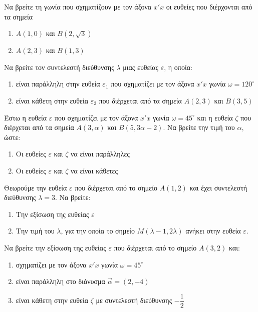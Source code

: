 \documentclass{../../presentation}
\begin{document}
\begin{askisi}
  Να βρείτε τη γωνία που σχηματίζουν με τον άξονα $x'x$ οι ευθείες που διέρχονται από τα σημεία
  \begin{enumerate}[<+->]
    \item $Α(1,0)$ και $Β(2,\sqrt{3})$
    \item $Α(2,3)$ και $Β(1,3)$
  \end{enumerate}
\end{askisi}

\begin{askisi}
  Να βρείτε τον συντελεστή διεύθυνσης $λ$ μιας ευθείας $ε$, η οποία:
  \begin{enumerate}[<+->]
    \item είναι παράλληλη στην ευθεία $ε_1$ που σχηματίζει με τον άξονα $x'x$ γωνία $ω=120^{\circ}$
    \item είναι κάθετη στην ευθεία $ε_2$ που διέρχεται από τα σημεία $Α(2,3)$ και $Β(3,5)$
  \end{enumerate}
\end{askisi}

\begin{askisi}
  Έστω η ευθεία $ε$ που σχηματίζει με τον άξονα $x'x$ γωνία $ω=45^{\circ}$ και η ευθεία $ζ$ που διέρχεται από τα σημεία $Α(3,α)$ και $Β(5,3α-2)$. Να βρείτε την τιμή του $α$, ώστε:
  \begin{enumerate}[<+->]
    \item Οι ευθείες $ε$ και $ζ$ να είναι παράλληλες
    \item Οι ευθείες $ε$ και $ζ$ να είναι κάθετες
  \end{enumerate}
\end{askisi}

\begin{askisi}
  Θεωρούμε την ευθεία $ε$ που διέρχεται από το σημείο $Α(1,2)$ και έχει συντελεστή διεύθυνσης $λ=3$. Να βρείτε:
  \begin{enumerate}[<+->]
    \item Την εξίσωση της ευθείας $ε$
    \item Την τιμή του $λ$, για την οποία το σημείο $Μ(λ-1,2λ)$ ανήκει στην ευθεία $ε$.
  \end{enumerate}
\end{askisi}

\begin{askisi}
  Να βρείτε την εξίσωση της ευθείας $ε$ που διέρχεται από το σημείο $Α(3,2)$ και:
  \begin{enumerate}[<+->]
    \item σχηματίζει με τον άξονα $x'x$ γωνία $ω=45^{\circ}$
    \item είναι παράλληλη στο διάνυσμα $\vec{α}=(2,-4)$
    \item είναι κάθετη στην ευθεία $ζ$ με συντελεστή διεύθυνσης $-\dfrac{1}{2}$
  \end{enumerate}
\end{askisi}
\end{document}
